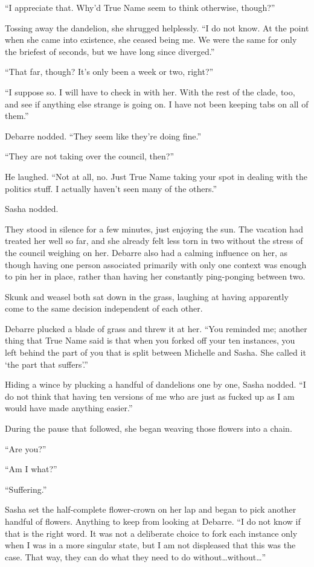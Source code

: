``I appreciate that. Why'd True Name seem to think otherwise, though?''

Tossing away the dandelion, she shrugged helplessly. ``I do not know. At the point when she came into existence, she ceased being me. We were the same for only the briefest of seconds, but we have long since diverged.''

``That far, though? It's only been a week or two, right?''

``I suppose so. I will have to check in with her. With the rest of the clade, too, and see if anything else strange is going on. I have not been keeping tabs on all of them.''

Debarre nodded. ``They seem like they're doing fine.''

``They are not taking over the council, then?''

He laughed. ``Not at all, no. Just True Name taking your spot in dealing with the politics stuff. I actually haven't seen many of the others.''

Sasha nodded.

They stood in silence for a few minutes, just enjoying the sun. The vacation had treated her well so far, and she already felt less torn in two without the stress of the council weighing on her. Debarre also had a calming influence on her, as though having one person associated primarily with only one context was enough to pin her in place, rather than having her constantly ping-ponging between two.

Skunk and weasel both sat down in the grass, laughing at having apparently come to the same decision independent of each other.

Debarre plucked a blade of grass and threw it at her. ``You reminded me; another thing that True Name said is that when you forked off your ten instances, you left behind the part of you that is split between Michelle and Sasha. She called it `the part that suffers'.''

Hiding a wince by plucking a handful of dandelions one by one, Sasha nodded. ``I do not think that having ten versions of me who are just as fucked up as I am would have made anything easier.''

During the pause that followed, she began weaving those flowers into a chain.

``Are you?''

``Am I what?''

``Suffering.''

Sasha set the half-complete flower-crown on her lap and began to pick another handful of flowers. Anything to keep from looking at Debarre. ``I do not know if that is the right word. It was not a deliberate choice to fork each instance only when I was in a more singular state, but I am not displeased that this was the case. That way, they can do what they need to do without\ldots without\ldots{}''

